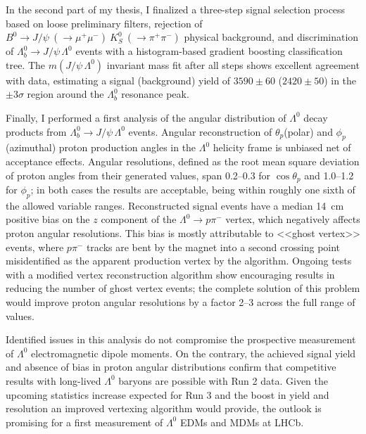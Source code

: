 \documentclass[12pt,a4paper]{book}
\newcommand{\demonstratorshort}{$\Lambda_b^0 \rightarrow J/\psi\,\Lambda^0$\xspace}
\newcommand{\physbkgfull}{$B^0 \rightarrow J/\psi~(\rightarrow \mu^+ \mu^-)~K^0_S~(\rightarrow \pi^+\pi^-)$\xspace}
\newcommand{\lz}{$\Lambda^0$\xspace}
\newcommand{\lbz}{$\Lambda_b^0$\xspace}
\newcommand{\lambdadecay}{$\Lambda^0 \rightarrow p\pi^-$\xspace}
\newcommand{\thetap}{$\theta_p$\xspace}
\newcommand{\cthetap}{$\cos\theta_p$\xspace}
\newcommand{\phip}{$\phi_p$\xspace}
\begin{document}
In the second part of my thesis, I finalized a three-step signal selection process based on loose preliminary filters, rejection of \physbkgfull physical background, and discrimination of \demonstratorshort events with a histogram-based gradient boosting classification tree.
The $m(J/\psi\,\Lambda^0)$ invariant mass fit after all steps shows excellent agreement with data, estimating a signal (background) yield of $3590 \pm 60$ ($2420 \pm 50$) in the $\pm3\sigma$ region around the \lbz resonance peak.

Finally, I performed a first analysis of the angular distribution of \lz decay products from \demonstratorshort events.
Angular reconstruction of \thetap (polar) and \phip (azimuthal) proton production angles in the \lz helicity frame is unbiased net of acceptance effects.
Angular resolutions, defined as the root mean square deviation of proton angles from their generated values, span 0.2--0.3 for \cthetap and 1.0--1.2 for \phip;
in both cases the results are acceptable, being within roughly one sixth of the allowed variable ranges.
Reconstructed signal events have a median \SI{14}{\centi\meter} positive bias on the $z$ component of the \lambdadecay vertex, which negatively affects proton angular resolutions.
This bias is mostly attributable to <<ghost vertex>> events, where $p\pi^-$ tracks are bent by the magnet into a second crossing point misidentified as the apparent production vertex by the algorithm.
Ongoing tests with a modified vertex reconstruction algorithm show encouraging results in reducing the number of ghost vertex events;
the complete solution of this problem would improve proton angular resolutions by a factor 2--3 across the full range of values.

Identified issues in this analysis do not compromise the prospective measurement of \lz electromagnetic dipole moments.
On the contrary, the achieved signal yield and absence of bias in proton angular distributions confirm that competitive results with long-lived \lz baryons are possible with Run 2 data.
Given the upcoming statistics increase expected for Run 3 and the boost in yield and resolution an improved vertexing algorithm would provide, the outlook is promising for a first measurement of \lz EDMs and MDMs at LHCb.
\end{document}
